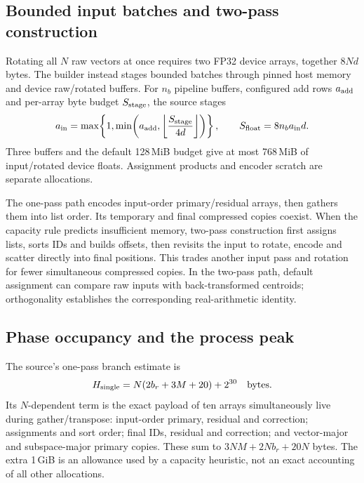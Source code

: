 \subsection{Bounded input batches and two-pass construction}

Rotating all $N$ raw vectors at once requires two FP32 device arrays,
together $8Nd$ bytes. The builder instead stages bounded batches through
pinned host memory and device raw/rotated buffers. For $n_b$ pipeline
buffers, configured add rows $a_{\rm add}$ and per-array byte budget
$S_{\rm stage}$, the source stages
\begin{equation}
 a_{\rm in}=\max\!\left\{1,\min\!\left(a_{\rm add},
 \left\lfloor\frac{S_{\rm stage}}{4d}\right\rfloor\right)\right\},
 \qquad S_{\rm float}=8n_ba_{\rm in}d.
 \label{eq:4-staging-rows}
\end{equation}
Three buffers and the default 128\,MiB budget give at most 768\,MiB of
input/rotated device floats. Assignment products and encoder scratch
are separate allocations.

The one-pass path encodes input-order primary/residual arrays, then
gathers them into list order. Its temporary and final compressed copies
coexist. When the capacity rule predicts insufficient memory, two-pass
construction first assigns lists, sorts IDs and builds offsets, then
revisits the input to rotate, encode and scatter directly into final
positions. This trades another input pass and rotation for fewer
simultaneous compressed copies. In the two-pass path, default assignment
can compare raw inputs with back-transformed centroids; orthogonality
establishes the corresponding real-arithmetic identity.

\subsection{Phase occupancy and the process peak}

The source's one-pass branch estimate is
\begin{equation}
 H_{\rm single}=N(2b_r+3M+20)+2^{30}\quad\text{bytes}.
 \label{eq:4-peak-heuristic}
\end{equation}
Its $N$-dependent term is the exact payload of ten arrays simultaneously
live during gather/transpose: input-order primary, residual and
correction; assignments and sort order; final IDs, residual and correction;
and vector-major and subspace-major primary copies. These sum to
$3NM+2Nb_r+20N$ bytes. The extra 1\,GiB is an allowance used by a
capacity heuristic, not an exact accounting of all other allocations.

